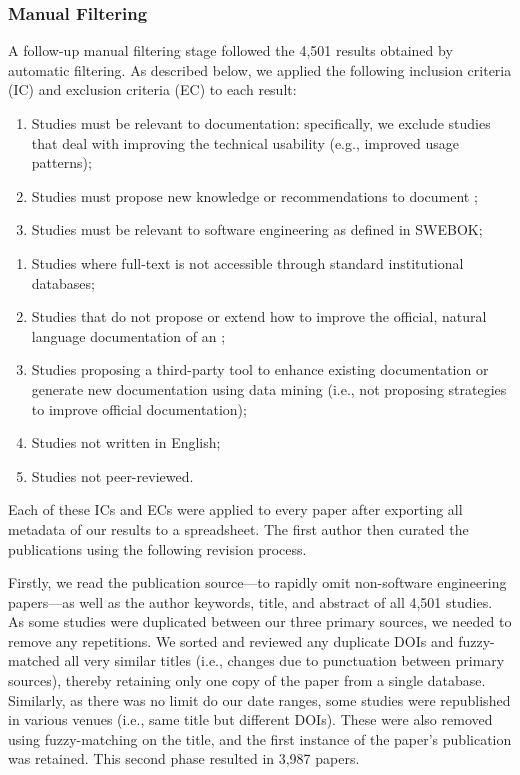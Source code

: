 \subsubsection{Manual Filtering}

A follow-up manual filtering stage followed the 4,501 results obtained by automatic filtering. As described below, we applied the following inclusion criteria (IC) and exclusion criteria (EC) to each result:

\begin{enumerate}[leftmargin=2\parindent,label=\textbf{IC\arabic*}]
  \item Studies must be relevant to  documentation: specifically, we exclude studies that deal with improving the technical  usability (e.g., improved usage patterns);
  \item Studies must propose new knowledge or recommendations to document ;
  \item Studies must be relevant to software engineering as defined in SWEBOK;
\end{enumerate}
\begin{enumerate}[leftmargin=2\parindent,label=\textbf{EC\arabic*}]
  \item Studies where full-text is not accessible through standard institutional databases; 
  \item Studies that do not propose or extend how to improve the official, natural language documentation of an ;
  \item Studies proposing a third-party tool to enhance existing documentation or generate new documentation using data mining (i.e., not proposing strategies to improve official documentation);
  \item Studies not written in English;
  \item Studies not peer-reviewed.
\end{enumerate}
\smallskip

Each of these ICs and ECs were applied to every paper  after exporting all  metadata of our results to a spreadsheet. The first author then curated the publications using the following revision process.

Firstly, we read the publication source---to rapidly omit non-software engineering papers---as well as the author keywords, title, and abstract of all 4,501 studies. As some studies were duplicated between our three primary sources, we needed to remove any repetitions. We sorted and reviewed any duplicate DOIs and fuzzy-matched all very similar titles (i.e., changes due to punctuation between primary sources), thereby retaining only one copy of the paper from a single database. Similarly, as there was no limit do our date ranges, some studies were republished in various venues (i.e., same title but different DOIs). These were also removed using fuzzy-matching on the title, and the first instance of the paper's publication was retained. This second phase resulted in 3,987 papers.


